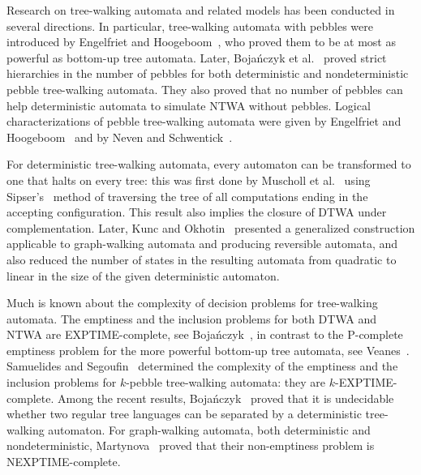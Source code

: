 \documentclass[12pt,a4paper]{article}
\theoremstyle{definition}
\begin{document}
Research on tree-walking automata and related models has been conducted in several directions.
In particular, tree-walking automata with pebbles
were introduced by Engelfriet and Hoogeboom~\cite{EngelfrietHoogeboom},
who proved them to be at most as powerful as bottom-up tree automata.
Later, Boja\'nczyk et al.~\cite{BojanczykSamuelidesSchwentickSegoufin}
proved strict hierarchies in the number of pebbles
for both deterministic and nondeterministic pebble tree-walking automata.
They also proved that no number of pebbles can help deterministic automata
to simulate NTWA without pebbles.
Logical characterizations of pebble tree-walking automata
were given by Engelfriet and Hoogeboom~\cite{EngelfrietHoogeboom,EngelfrietHoogeboom_capture_logic}
and by Neven and Schwentick~\cite{NevenSchwentick}.

For deterministic tree-walking automata,
every automaton can be transformed to one that halts on every tree:
this was first done by Muscholl et al.~\cite{MuschollSamuelidesSegoufin}
using Sipser's~\cite{Sipser_halting} method
of traversing the tree of all computations ending in the accepting configuration.
This result also implies the closure of DTWA under complementation.
Later, Kunc and Okhotin~\cite{KuncOkhotin_reversible}
presented a generalized construction applicable to graph-walking automata
and producing reversible automata,
and also reduced the number of states in the resulting automata from quadratic to linear
in the size of the given deterministic automaton.

Much is known about the complexity of decision problems for tree-walking automata.
The emptiness and the inclusion problems for both DTWA and NTWA are EXPTIME-complete,
see Boja\'nczyk~\cite{Bojanczyk},
in contrast to the P-complete emptiness problem
for the more powerful bottom-up tree automata, see Veanes~\cite{Veanes}.
Samuelides and Segoufin~\cite{SamuelidesSegoufin}
determined the complexity of the emptiness and the inclusion problems
for $k$-pebble tree-walking automata: they are $k$-EXPTIME-complete.
Among the recent results,
Boja\'nczyk~\cite{Bojanczyk_separating_by_dtwa} proved
that it is undecidable whether two regular tree languages
can be separated by a deterministic tree-walking automaton.
For graph-walking automata, both deterministic and nondeterministic, Martynova~\cite{Martynova_emptiness}
proved that their non-emptiness problem is NEXPTIME-complete.
\end{document}
